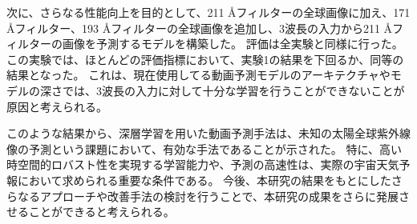   次に、さらなる性能向上を目的として、211 \AA フィルターの全球画像に加え、171 \AA フィルター、193 \AA フィルターの全球画像を追加し、3波長の入力から211 \AA フィルターの画像を予測するモデルを構築した。
  評価は全実験と同様に行った。
  この実験では、ほとんどの評価指標において、実験1の結果を下回るか、同等の結果となった。
  これは、現在使用してる動画予測モデルのアーキテクチャやモデルの深さでは、3波長の入力に対して十分な学習を行うことができないことが原因と考えられる。

  このような結果から、深層学習を用いた動画予測手法は、未知の太陽全球紫外線像の予測という課題において、有効な手法であることが示された。
  特に、高い時空間的ロバスト性を実現する学習能力や、予測の高速性は、実際の宇宙天気予報において求められる重要な条件である。
  今後、本研究の結果をもとにしたさらなるアプローチや改善手法の検討を行うことで、本研究の成果をさらに発展させることができると考えられる。

